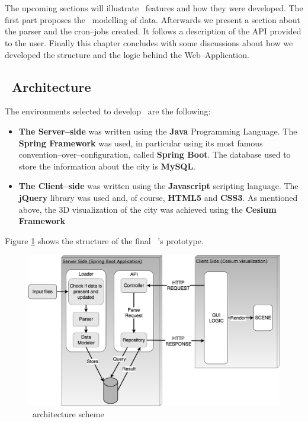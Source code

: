 \section{\applicationName} \label{projectDesign}
The upcoming sections will illustrate \applicationName\ features and how they were developed. The first part proposes the \applicationName\ modelling of data. Afterwards we present a section about the parser and the cron--jobs created. It follows a description of the API provided to the user. Finally this chapter concludes with some discussions about how we developed the structure and the logic behind the Web--Application.

\subsection{\applicationName\ Architecture}
The environments selected to develop \applicationName\ are the following:
\begin{itemize}
	\item {\bf The Server--side} was written using the {\bf Java} Programming Language. The {\bf Spring Framework} was used, in particular using its most famous convention--over--configuration, called {\bf Spring Boot}. The database used to store the information about the city is {\bf MySQL}.
	\item {\bf The Client--side} was written using the {\bf Javascript} scripting language. The {\bf jQuery} library was used and, of course, {\bf HTML5} and {\bf CSS3}. As mentioned above, the 3D visualization of the city was achieved using the {\bf Cesium Framework}
\end{itemize}
Figure \ref{fig:project_structure} shows the structure of the final \applicationName\ 's prototype.
\begin{figure}[H]
\centering
\includegraphics[width=1.0\textwidth]{chapter3/images/project_structure}
\caption{\applicationName\ architecture scheme}
\label{fig:project_structure}
\end{figure}

